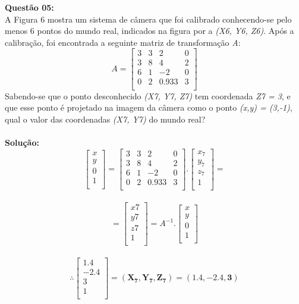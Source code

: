 \vspace{1cm}
\noindent\textbf{Questão 05:}\\
A Figura 6 mostra um sistema de câmera que foi calibrado conhecendo-se pelo menos 6 pontos do mundo
real, indicados na figura por  a \emph{(X6, Y6, Z6)}. Após a calibração, foi encontrada a seguinte matriz de transformação \emph{A}:
\[
A = \begin{bmatrix}
    3&3&2&0\\
    3&8&4&2\\
    6&1&-2&0\\
    0&2&0.933&3\\
\end{bmatrix}
\]
Sabendo-se que o ponto desconhecido \emph{(X7, Y7, Z7)} tem coordenada \emph{Z7 = 3}, e que esse ponto é projetado
na imagem da câmera como o ponto \emph{(x,y) = (3,-1)}, qual o valor das coordenadas \emph{(X7, Y7)} do mundo real?\\
\\
\noindent\textbf{Solução:}
\\
\[
\begin{bmatrix}
    x\\
    y\\
    0\\
    1\\
\end{bmatrix} = 
\begin{bmatrix}
    3&3&2&0\\
    3&8&4&2\\
    6&1&-2&0\\
    0&2&0.933&3\\
\end{bmatrix}
.
\begin{bmatrix}
    x_{7}\\
    y_{7}\\
    z_{7}\\
    1\\
\end{bmatrix} =
\]
\\
\[
= \begin{bmatrix}
    x{7}\\
    y{7}\\
    z{7}\\
    1\\
\end{bmatrix} = 
A^{-1} . 
\begin{bmatrix}
    x\\
    y\\
    0\\
    1\\
\end{bmatrix}
\]
\\
\[
\therefore \begin{bmatrix}
    1.4\\
    -2.4\\
    3\\
    1\\
\end{bmatrix} = 
\mathbf{(X_{7},Y_{7},Z_{7}) = (1.4, -2.4, 3)}
\]

